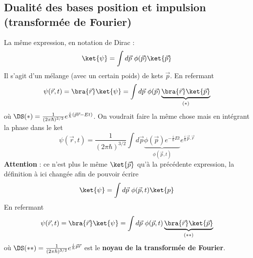 	\subsection{Dualité des bases position et impulsion (transformée de Fourier)}
	La même expression, en notation de Dirac :
	\begin{equation}
	\ket{\psi} = \int d\vec{p}\ \phi(\vec{p})\ket{\vec{p}}
	\end{equation}
	Il s'agit d'un mélange (avec un certain poids) de kets $\vec{p}$. En refermant
		\begin{equation}
	\psi(\vec{r},t) = \bra{\vec{r}}\ket{\psi} = \int d\vec{p}\ \phi(\vec{p})\underbrace{
	\bra{\vec{r}}\ket{\vec{p}}}_{(*)}
	\end{equation}
	où $\DS (*) = \frac{1}{(2\pi\hbar)^{3/2}}e^{\frac{i}{\hbar}(\vec{p}\vec{r}-Et)}$. On voudrait 
	faire la même chose mais en intégrant la phase dans le ket
	\begin{equation}
		\psi(\vec{r},t) = \frac{1}{(2\pi\hbar)^{3/2}}\int d\vec{p} \underbrace{\phi(\vec{p})e^{-\frac{i}
	{\hbar}Et}}_{\phi(\vec{p},t)}e^{\frac{i}{\hbar}\vec{p}.\vec{r}}
	\end{equation}
	\textbf{Attention} : ce n'est plus le même $\ket{\vec{p}}$ qu'à la précédente expression, la 
	définition à ici changée afin de pouvoir écrire
	\begin{equation}
	\ket{\psi} = \int d\vec{p}\ \phi(\vec{p},t)\ket{p}
		\end{equation}
	En refermant
	\begin{equation}
	\psi(\vec{r},t) = \bra{\vec{r}}\ket{\psi} = \int d\vec{p}\ \phi(\vec{p},t)
	\underbrace{\bra{\vec{r}}\ket{\vec{p}}}_{(**)}
		\end{equation}
	où $\DS (**)= \frac{1}{(2\pi\hbar)^{3/2}}e^{\frac{i}{\hbar}\vec{p}\vec{r}}$ est le 
	\textbf{noyau de la transformée de Fourier}.\\
	
